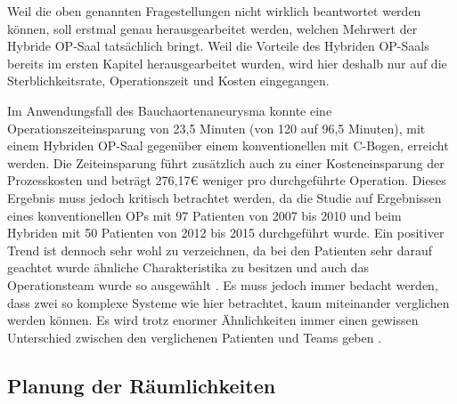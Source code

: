 Weil die oben genannten Fragestellungen nicht wirklich beantwortet werden können, soll erstmal genau herausgearbeitet werden, welchen Mehrwert der Hybride OP-Saal tatsächlich bringt. Weil die Vorteile des Hybriden OP-Saals bereits im ersten Kapitel herausgearbeitet wurden, wird hier deshalb nur auf die Sterblichkeitsrate, Operationszeit und Kosten eingegangen.

Im Anwendungsfall des Bauchaortenaneurysma konnte eine Operationszeiteinsparung von 23,5 Minuten (von 120 auf 96,5 Minuten), mit einem Hybriden OP-Saal gegenüber einem konventionellen mit C-Bogen, erreicht werden. Die Zeiteinsparung führt zusätzlich auch zu einer Kosteneinsparung der Prozesskosten und beträgt 276,17€ weniger pro durchgeführte Operation.
Dieses Ergebnis muss jedoch kritisch betrachtet werden, da die Studie auf Ergebnissen eines konventionellen OPs mit 97 Patienten von 2007 bis 2010 und beim Hybriden mit 50 Patienten von 2012 bis 2015 durchgeführt wurde. Ein positiver Trend ist dennoch sehr wohl zu verzeichnen, da bei den Patienten sehr darauf geachtet wurde ähnliche Charakteristika zu besitzen und auch das Operationsteam wurde so ausgewählt \cite{HybriderVsKonventioneller}.
Es muss jedoch immer bedacht werden, dass zwei so komplexe Systeme wie hier betrachtet, kaum miteinander verglichen werden können. Es wird trotz enormer Ähnlichkeiten immer einen gewissen Unterschied zwischen den verglichenen Patienten und Teams geben \cite{DerDigitaleOperationssaal}.







\subsection{Planung der Räumlichkeiten}

